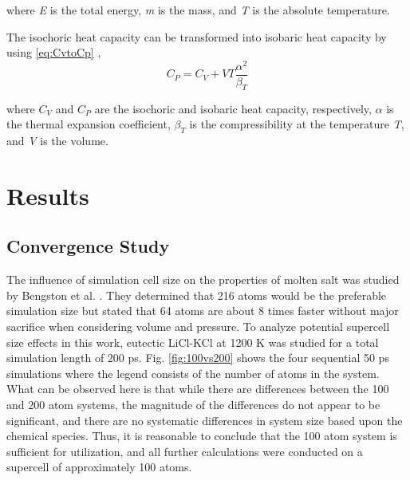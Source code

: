 \documentclass[review]{elsarticle}
\begin{document}
\noindent where \textit{E} is the total energy, \textit{m} is the mass, and \textit{T} is the absolute temperature.

The isochoric heat capacity can be transformed into isobaric heat capacity by using \cref{eq:CvtoCp} \cite{Gaskell},
\begin{equation}
  \label{eq:CvtoCp}
     C_P = C_V + VT\frac{\alpha^2}{\beta_T}
\end{equation}

\noindent where \textit{$C_V$} and \textit{$C_P$} are the isochoric and isobaric heat capacity, respectively, \textit{$\alpha$} is the thermal expansion coefficient, \textit{$\beta_T$} is the compressibility at the temperature \textit{T}, and \textit{V} is the volume.
\FloatBarrier


\section{Results}

\subsection{Convergence Study}
The influence of simulation cell size on the properties of molten salt was studied by Bengston et al. \cite{Bengston2014}. They determined that 216 atoms would be the preferable simulation size but stated that 64 atoms are about 8 times faster without major sacrifice when considering volume and pressure. To analyze potential supercell size effects in this work, eutectic LiCl-KCl at 1200 K was studied for a total simulation length of 200 ps. Fig. \ref{fig:100vs200} shows the four sequential 50 ps simulations where the legend consists of the number of atoms in the system. What can be observed here is that while there are differences between the 100 and 200 atom systems, the magnitude of the differences do not appear to be significant, and there are no systematic differences in system size based upon the chemical species. Thus, it is reasonable to conclude that the 100 atom system is sufficient for utilization, and all further calculations were conducted on a supercell of approximately 100 atoms. 
\end{document}

